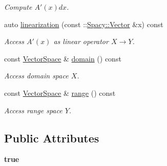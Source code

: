 \begin{DoxyCompactItemize}
\begin{DoxyCompactList}\small\item\em Compute $A'(x)dx$. \end{DoxyCompactList}\item 
auto \hyperlink{classSpacy_1_1dealII_1_1C1FunGOperator_3_01FunGOperator_00_01dim_00_01VariableDim_3_01variable__dims_8_8_8_4_01_4_a23e60fc5f8c950b68eaafd728dd8f118}{linearization} (const \-::\hyperlink{classSpacy_1_1Vector}{Spacy\-::\-Vector} \&x) const 
\begin{DoxyCompactList}\small\item\em Access $A'(x)$ as linear operator $X\rightarrow Y$. \end{DoxyCompactList}\item 
\hypertarget{classSpacy_1_1OperatorBase_a2588f9b3e0188820c4c494e63293dc6f}{const \hyperlink{classSpacy_1_1VectorSpace}{Vector\-Space} \& \hyperlink{classSpacy_1_1OperatorBase_a2588f9b3e0188820c4c494e63293dc6f}{domain} () const }\label{classSpacy_1_1OperatorBase_a2588f9b3e0188820c4c494e63293dc6f}

\begin{DoxyCompactList}\small\item\em Access domain space $X$. \end{DoxyCompactList}\item 
\hypertarget{classSpacy_1_1OperatorBase_ab19d3b7a6f290b1079248f1e567e53d6}{const \hyperlink{classSpacy_1_1VectorSpace}{Vector\-Space} \& \hyperlink{classSpacy_1_1OperatorBase_ab19d3b7a6f290b1079248f1e567e53d6}{range} () const }\label{classSpacy_1_1OperatorBase_ab19d3b7a6f290b1079248f1e567e53d6}

\begin{DoxyCompactList}\small\item\em Access range space $Y$. \end{DoxyCompactList}\end{DoxyCompactItemize}
\subsection*{Public Attributes}
\begin{DoxyCompactItemize}
\item 
\hypertarget{classSpacy_1_1dealII_1_1C1FunGOperator_3_01FunGOperator_00_01dim_00_01VariableDim_3_01variable__dims_8_8_8_4_01_4_a2e4adb874853cc98f96363eb28d632b3}{{\bfseries true}}\label{classSpacy_1_1dealII_1_1C1FunGOperator_3_01FunGOperator_00_01dim_00_01VariableDim_3_01variable__dims_8_8_8_4_01_4_a2e4adb874853cc98f96363eb28d632b3}

\end{DoxyCompactItemize}


